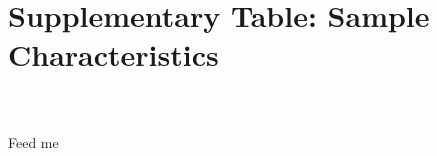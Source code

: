\documentclass[hidelinks,10pt,letterpaper]{article}
\date{}
\begin{document}
\section*{Supplementary Table: Sample Characteristics}

\setcounter{table}{0}
\renewcommand\thetable{\Alph{table}}


\begin{table}[H]

\caption{FGC table}
\\
\\
\textrm{Feed me}
\label{fgc_table}
\end{table}
\end{document}
